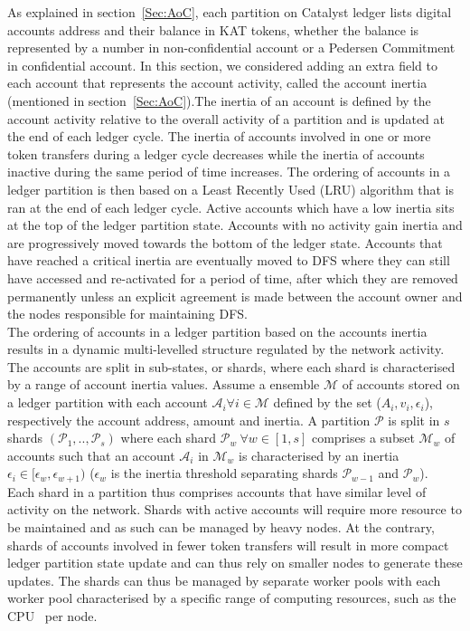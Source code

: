As explained in section~\ref{Sec:AoC}, each partition on Catalyst ledger lists digital accounts address and their balance in KAT tokens, whether the balance is represented by a number in non-confidential account or a Pedersen Commitment in confidential account. In this section, we considered adding an extra field to each account that represents the account activity, called the account inertia (mentioned in section~\ref{Sec:AoC}).The inertia of an account is defined by the account activity relative to the overall activity of a partition and is updated at the end of each ledger cycle. The inertia of accounts involved in one or more token transfers during a ledger cycle decreases while the inertia of accounts inactive during the same period of time increases. The ordering of accounts in a ledger partition is then based on a Least Recently Used (LRU) algorithm that is ran at the end of each ledger cycle. Active accounts which have a low inertia sits at the top of the ledger partition state. Accounts with no activity gain inertia and are progressively moved towards the bottom of the ledger state. Accounts that have reached a critical inertia are eventually moved to DFS where they can still have accessed and re-activated for a period of time, after which they are removed permanently unless an explicit agreement is made between the account owner and the nodes responsible for maintaining DFS. \\

The ordering of accounts in a ledger partition based on the accounts inertia results in a dynamic multi-levelled structure regulated by the network activity. The accounts are split in sub-states, or shards, where each shard is characterised by a range of account inertia values. Assume a ensemble $\mathcal{M}$ of accounts stored on a ledger partition with each account $\mathcal{A}_i \forall i \in \mathcal{M}$ defined by the set ($A_i, v_i, \epsilon_i$), respectively the account address, amount and inertia. A partition $\mathcal{P}$ is split in $s$ shards $(\mathcal{P}_1,..,\mathcal{P}_s)$ where each shard $\mathcal{P}_w~\forall w \in [1,s]$ comprises a subset $\mathcal{M}_w$ of accounts such that an account $\mathcal{A}_i$ in $\mathcal{M}_w$ is characterised by an inertia $\epsilon_i \in [\epsilon_w, \epsilon_{w+1})$ ($\epsilon_w$ is the inertia threshold separating shards $\mathcal{P}_{w-1}$ and $\mathcal{P}_{w}$).\\ 

Each shard in a partition thus comprises accounts that have similar level of activity on the network. Shards with active accounts will require more resource to be maintained and as such can be managed by heavy nodes. At the contrary, shards of accounts involved in fewer token transfers will result in more compact ledger partition state update and can thus rely on smaller nodes to generate these updates. The shards can thus be managed by separate worker pools with each worker pool characterised by a specific range of computing resources, such as the CPU~\cite{coremark} per node. \\

